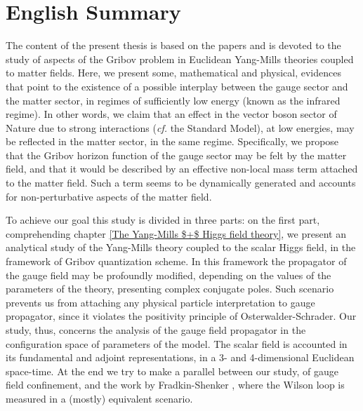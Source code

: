\chapter*{English Summary}


The content of the present thesis is based on the papers
\cite{Capri:2013oja,Capri:2013gha,Capri:2012ah,Capri:2012cr,Capri:2014jqa,Canfora:2015yia,Capri:2015mna}
and is devoted to the study of aspects of the Gribov problem in Euclidean Yang-Mills
theories coupled to matter fields. Here, we present some, mathematical and physical,
evidences that point to the existence of a possible interplay between the gauge sector
and the matter sector, in regimes of sufficiently low energy (known as the infrared regime). In
other words, we claim that an effect in the vector boson sector of Nature due to strong
interactions (\emph{cf.} the Standard Model), at low energies, may be reflected in
the matter sector, in the same regime. Specifically, we propose that the Gribov
horizon function of the gauge sector may be felt by the matter field, and that it would be
described by an effective non-local mass term attached to the matter field. Such a term seems
to be dynamically generated and accounts for non-perturbative aspects of the matter field.

To achieve our goal this study is divided in three parts: 
on the first part, comprehending chapter \ref{The Yang-Mills $+$ Higgs field
theory}, we present an analytical study of the Yang-Mills theory coupled to the scalar Higgs
field, in the framework of Gribov quantization scheme. In this framework the propagator of the
gauge field may be profoundly modified, depending on the values of the parameters of the
theory, presenting complex conjugate poles. Such scenario prevents us from
attaching any physical particle interpretation to gauge propagator, since it violates the
positivity principle of Osterwalder-Schrader. Our study, thus, concerns the analysis of
the gauge field propagator in the configuration space of parameters of the model. The scalar
field is accounted in its fundamental and adjoint representations, in a 3- and 4-dimensional
Euclidean space-time. At the end we try to make a parallel between our study, of gauge field
confinement, and the work by Fradkin-Shenker \cite{Fradkin:1978dv}, where the Wilson loop is
measured in a (mostly) equivalent scenario.


